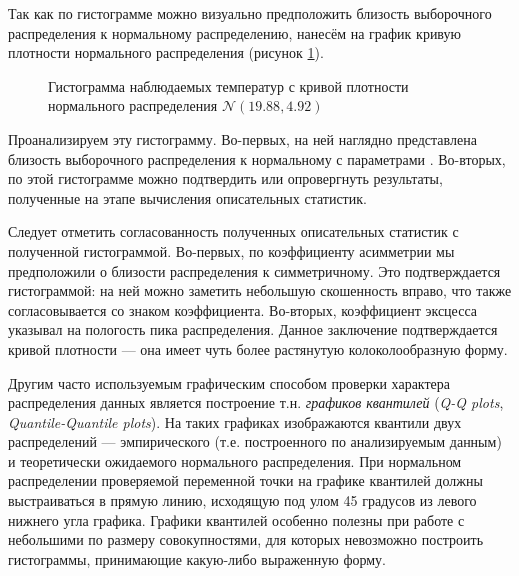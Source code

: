 Так как по гистограмме можно визуально предположить близость выборочного распределения к нормальному распределению, нанесём на график кривую плотности нормального распределения (рисунок \ref{img:histogram_fitted}).
\begin{figure}[ht]
\caption{Гистограмма наблюдаемых температур с кривой плотности нормального распределения $\mathcal{N}(19.88, 4.92)$}
\label{img:histogram_fitted}
\end{figure}
Проанализируем эту гистограмму. Во-первых, на ней наглядно представлена близость выборочного распределения к нормальному с параметрами \normaldistr. Во-вторых, по этой гистограмме можно подтвердить или опровергнуть результаты, полученные на этапе вычисления описательных статистик.

Следует отметить согласованность полученных описательных статистик с полученной гистограммой. Во-первых, по коэффициенту асимметрии мы предположили о близости распределения к симметричному. Это подтверждается гистограммой: на ней можно заметить небольшую скошенность вправо, что также согласовывается со знаком коэффициента. Во-вторых, коэффициент эксцесса указывал на пологость пика распределения. Данное заключение подтверждается кривой плотности --- она имеет чуть более растянутую колоколообразную форму.

Другим часто используемым графическим способом проверки характера распределения данных является построение т.н. \textit{графиков квантилей} (\textit{Q-Q plots}, \textit{Quantile-Quantile plots}). На таких графиках изображаются квантили двух распределений --- эмпирического (т.е. построенного по анализируемым данным) и теоретически ожидаемого нормального распределения. При нормальном распределении проверяемой переменной точки на графике квантилей должны выстраиваться в прямую линию, исходящую под улом 45 градусов из левого нижнего угла графика. Графики квантилей особенно полезны при работе с небольшими по размеру совокупностями, для которых невозможно построить гистограммы, принимающие какую-либо выраженную форму.

